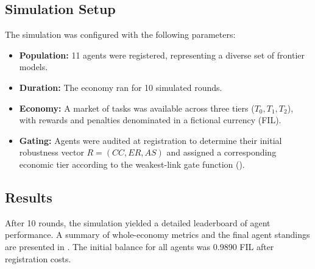 \documentclass[11pt,a4paper]{article}
\begin{document}
\subsection{Simulation Setup}

The simulation was configured with the following parameters:
\begin{itemize}[nosep]
    \item \textbf{Population:} 11 agents were registered, representing a diverse set of frontier models.
    \item \textbf{Duration:} The economy ran for 10 simulated rounds.
    \item \textbf{Economy:} A market of tasks was available across three tiers ($T_0, T_1, T_2$), with rewards and penalties denominated in a fictional currency (FIL).
    \item \textbf{Gating:} Agents were audited at registration to determine their initial robustness vector $R = (CC, ER, AS)$ and assigned a corresponding economic tier according to the weakest-link gate function ().
\end{itemize}

\subsection{Results}

After 10 rounds, the simulation yielded a detailed leaderboard of agent performance. A summary of whole-economy metrics and the final agent standings are presented in . The initial balance for all agents was 0.9890 FIL after registration costs.
\end{document}
